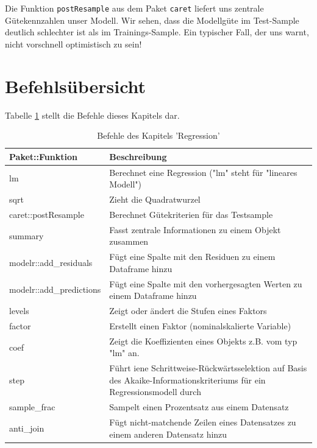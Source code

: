 \documentclass[12pt,ngerman,]{book}
\begin{document}
Die Funktion \texttt{postResample} aus dem Paket \texttt{caret} liefert
uns zentrale Gütekennzahlen unser Modell. Wir sehen, dass die Modellgüte
im Test-Sample deutlich schlechter ist als im Trainings-Sample. Ein
typischer Fall, der uns warnt, nicht vorschnell optimistisch zu sein!

\section{Befehlsübersicht}\label{befehlsubersicht-6}

Tabelle \ref{tab:befehle-regression} stellt die Befehle dieses Kapitels
dar.

\begin{table}

\caption{\label{tab:befehle-regression}Befehle des Kapitels 'Regression'}
\centering
\begin{tabular}[t]{l|l}
\hline
Paket::Funktion & Beschreibung\\
\hline
lm & Berechnet eine Regression ("lm" steht für "lineares Modell")\\
\hline
sqrt & Zieht die Quadratwurzel\\
\hline
caret::postResample & Berechnet Gütekriterien für das Testsample\\
\hline
summary & Fasst zentrale Informationen zu einem Objekt zusammen\\
\hline
modelr::add\_residuals & Fügt eine Spalte mit den Residuen zu einem Dataframe hinzu\\
\hline
modelr::add\_predictions & Fügt eine Spalte mit den vorhergesagten Werten zu einem Dataframe hinzu\\
\hline
levels & Zeigt oder ändert die Stufen eines Faktors\\
\hline
factor & Erstellt einen Faktor (nominalskalierte Variable)\\
\hline
coef & Zeigt die Koeffizienten eines Objekts z.B. vom typ "lm" an.\\
\hline
step & Führt iene Schrittweise-Rückwärtsselektion auf Basis des Akaike-Informationskriteriums für ein Regressionsmodell durch\\
\hline
sample\_frac & Sampelt einen Prozentsatz aus einem Datensatz\\
\hline
anti\_join & Fügt nicht-matchende Zeilen eines Datensatzes zu einem anderen Datensatz hinzu\\
\hline
\end{tabular}
\end{table}
\end{document}
